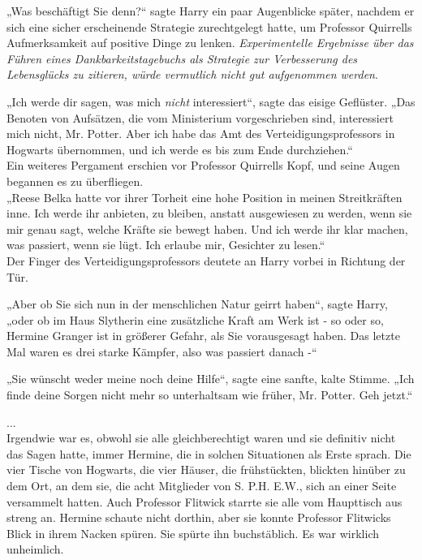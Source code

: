 {„Was beschäftigt Sie denn?“ sagte Harry ein paar Augenblicke später, nachdem er sich eine sicher erscheinende Strategie zurechtgelegt hatte, um Professor Quirrells Aufmerksamkeit auf positive Dinge zu lenken. \emph{Experimentelle Ergebnisse über das Führen eines Dankbarkeitstagebuchs als Strategie zur Verbesserung des Lebensglücks zu zitieren, würde vermutlich nicht gut aufgenommen werden}.

„Ich werde dir sagen, was mich \emph{nicht} interessiert“, sagte das eisige Geflüster. „Das Benoten von Aufsätzen, die vom Ministerium vorgeschrieben sind, interessiert mich nicht, Mr. Potter. Aber ich habe das Amt des Verteidigungsprofessors in Hogwarts übernommen, und ich werde es bis zum Ende durchziehen.“\\ Ein weiteres Pergament erschien vor Professor Quirrells Kopf, und seine Augen begannen es zu überfliegen.\\ „Reese Belka hatte vor ihrer Torheit eine hohe Position in meinen Streitkräften inne. Ich werde ihr anbieten, zu bleiben, anstatt ausgewiesen zu werden, wenn sie mir genau sagt, welche Kräfte sie bewegt haben. Und ich werde ihr klar machen, was passiert, wenn sie lügt. Ich erlaube mir, Gesichter zu lesen.“\\ Der Finger des Verteidigungsprofessors deutete an Harry vorbei in Richtung der Tür.

„Aber ob Sie sich nun in der menschlichen Natur geirrt haben“, sagte Harry, „oder ob im Haus Slytherin eine zusätzliche Kraft am Werk ist - so oder so, Hermine Granger ist in größerer Gefahr, als Sie vorausgesagt haben. Das letzte Mal waren es drei starke Kämpfer, also was passiert danach -“

„Sie wünscht weder meine noch deine Hilfe“, sagte eine sanfte, kalte Stimme. „Ich finde deine Sorgen nicht mehr so unterhaltsam wie früher, Mr. Potter. Geh jetzt.“

...\\ Irgendwie war es, obwohl sie alle gleichberechtigt waren und sie definitiv nicht das Sagen hatte, immer Hermine, die in solchen Situationen als Erste sprach. Die vier Tische von Hogwarts, die vier Häuser, die frühstückten, blickten hinüber zu dem Ort, an dem sie, die acht Mitglieder von S. P.H. E.W., sich an einer Seite versammelt hatten. Auch Professor Flitwick starrte sie alle vom Haupttisch aus streng an. Hermine schaute nicht dorthin, aber sie konnte Professor Flitwicks Blick in ihrem Nacken spüren. Sie spürte ihn buchstäblich. Es war wirklich unheimlich.

}

